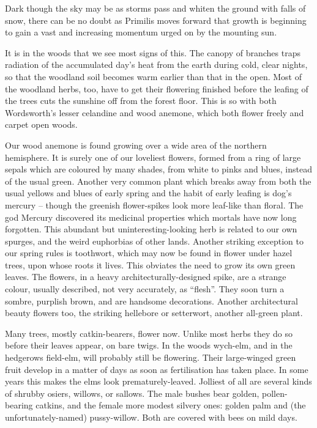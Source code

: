 Dark though the sky may be as storms pass and whiten the ground with falls of snow, there can be no doubt as Primilis moves forward that growth is beginning to gain a vast and increasing momentum urged on by the mounting sun.

It is in the woods that we see most signs of this. The canopy of branches traps radiation of the accumulated day's heat from the earth during cold, clear nights, so that the woodland soil becomes warm earlier than that in the open. Most of the woodland herbs, too, have to get their flowering finished before the leafing of the trees cuts the sunshine off from the forest floor. This is so with both Wordsworth's lesser celandine and wood anemone, which both flower freely and carpet open woods.

Our wood anemone is found growing over a wide area of the northern hemisphere. It is surely one of our loveliest flowers, formed from a ring of large sepals which are coloured by many shades, from white to pinks and blues, instead of the usual green. Another very common plant which breaks away from both the usual yellows and blues of early spring and the habit of early leafing is dog's mercury -- though the greenish flower-spikes look more leaf-like than floral. The god Mercury  discovered its medicinal properties which mortals have now long forgotten. This abundant but uninteresting-looking herb is related to our own spurges, and the weird euphorbias of other lands. Another striking exception to our spring rules is toothwort, which may now be found in flower under hazel trees, upon whose roots it lives. This obviates the need to grow its own green leaves. The flowers, in a heavy architecturally-designed spike, are a strange colour, usually described, not very accurately, as ``flesh''. They soon turn a sombre, purplish brown, and are handsome decorations. Another architectural beauty flowers too, the striking hellebore or setterwort, another all-green plant.

Many trees, mostly catkin-bearers, flower now. Unlike most herbs they do so before their leaves appear, on bare twigs. In the woods wych-elm, and in the hedgerows field-elm, will probably still be flowering. Their large-winged green fruit develop in a matter of days as soon as fertilisation has taken place. In some years this makes the elms look prematurely-leaved. Jolliest of all are several kinds of shrubby osiers, willows, or sallows. The male bushes bear golden, pollen-bearing catkins, and the female more modest silvery ones: golden palm and (the unfortunately-named) pussy-willow. Both are covered with bees on mild days.

